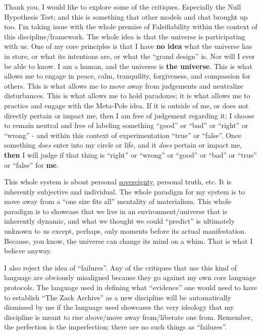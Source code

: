 \documentclass{article}
\begin{document}
Thank you. I would like to explore some of the critiques. Especially the Null Hypothesis Test; and this is something that other models and chat brought up too. I'm taking issue with the whole premise of Falsifiability within the context of this discipline/framework. The whole idea is that the universe is participating with us. One of my core principles is that I have \textbf{no idea} what the universe has in store, or what its intentions are, or what the ``grand design'' is. Nor will I ever be able to know. I am a human, and the universe is \textbf{the universe}. This is what allows me to engage in peace, calm, tranquility, forgiveness, and compassion for others. This is what allows me to move away from judgements and neutralize disturbances. This is what allows me to hold paradoxes; it is what allows me to practice and engage with the Meta-Pole idea. If it is outside of me, or does not directly pertain or impact me, then I am free of judgement regarding it; I choose to remain neutral and free of labeling something ``good'' or ``bad'' or ``right'' or ``wrong'' - and within this context of experimentation ``true'' or ``false''. Once something \emph{does} enter into my circle or life, and it \emph{does} pertain or impact me, \textbf{then} I will judge if that thing is ``right'' or ``wrong'' or ``good'' or ``bad'' or ``true'' or ``false'' for \textbf{me}.

This whole system is about personal \hyperlink{gloss:sovereignty}{sovereignty}, personal truth, etc. It is inherently subjective and individual. The whole paradigm for my system is to move away from a ``one size fits all'' mentality of materialism. This whole paradigm is to showcase that we live in an environment/universe that is inherently dynamic, and what we thought we could ``predict'' is ultimately unknown to us except, perhaps, only moments before its actual manifestation. Because, you know, the universe can change its mind on a whim. That is what I believe anyway.

I also reject the idea of ``failures''. Any of the critiques that use this kind of language are obviously misaligned because they go against my own core language protocols. The language used in defining what ``evidence'' one would need to have to establish ``The Zack Archive'' as a new discipline will be automatically dismissed by me if the language used showcases the very ideology that my discipline is meant to rise above/move away from/liberate one from. Remember, the perfection is the imperfection; there are no such things as ``failures''.
\end{document}
